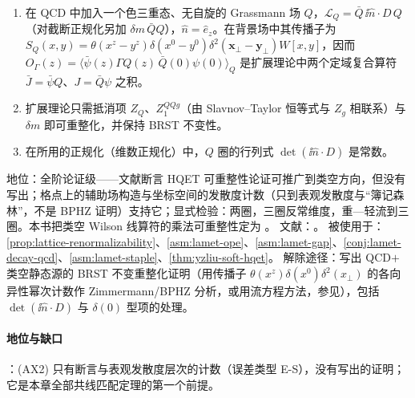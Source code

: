 \begin{assumption}\label{asm:lamet-aux-renorm}
\begin{enumerate}[label=(AX\arabic*),leftmargin=3.2em,itemsep=1pt,topsep=2pt]
\item 在 QCD 中加入一个色三重态、无自旋的 Grassmann 场 $Q$，$\mathcal L_Q=\bar Q\,\ii\hat n\cdot D\,Q$（对截断正规化另加 $\delta m\,\bar QQ$），$\hat n=\hat e_z$。在背景场中其传播子为 $S_Q(x,y)=\theta(x^z-y^z)\delta(x^0-y^0)\delta^2(\mathbf x_\perp-\mathbf y_\perp)W[x,y]$，因而 $O_\Gamma(z)=\langle\bar\psi(z)\Gamma Q(z)\,\bar Q(0)\psi(0)\rangle_Q$ 是扩展理论中两个定域复合算符 $\bar J=\bar\psi Q$、$J=\bar Q\psi$ 之积。
\item 扩展理论只需抵消项 $Z_Q$、$Z_1^{QQg}$（由 Slavnov--Taylor 恒等式与 $Z_g$ 相联系）与 $\delta m$ 即可重整化，并保持 BRST 不变性。
\item 在所用的正规化（维数正规化）中，$Q$ 圈的行列式 $\det(\ii\hat n\cdot D)$ 是常数。
\end{enumerate}
地位：全阶论证级——文献\cite{Ji:2017oey}断言 HQET 可重整性论证可推广到类空方向，但没有写出；格点上的辅助场构造\cite{Green:2017xeu}与坐标空间的发散度计数\cite{Ishikawa:2017faj}（只到表观发散度与“簿记森林”，不是 BPHZ 证明）支持它；显式检验：两圈\cite{Ji:2015jwa}，三圈反常维度\cite{Braun:2020ymy}，重—轻流到三圈\cite{Chetyrkin:2003vi}。本书把类空 Wilson 线算符的乘法可重整性定为 \tagA。
文献：\cite{Ji:2017oey,Green:2017xeu,Ishikawa:2017faj,Dorn:1986dt,Dotsenko:1979wb,Braun:2020ymy,Chetyrkin:2003vi}。
被使用于：\cref{prop:lattice-renormalizability}、\cref{asm:lamet-ope}、\cref{asm:lamet-gap}、\cref{conj:lamet-decay-qcd}、\cref{asm:lamet-staple}、\cref{thm:yzliu-soft-hqet}。
解除途径：写出 QCD$+$类空静态源的 BRST 不变重整化证明（用传播子 $\theta(x^z)\delta(x^0)\delta^2(x_\perp)$ 的各向异性幂次计数作 Zimmermann/BPHZ 分析，或用流方程方法，参见\cite{Frob:2015uqy}），包括 $\det(\ii\hat n\cdot D)$ 与 $\delta(0)$ 型项的处理。
\end{assumption}

\paragraph{地位与缺口}
\tagA：(AX2) 只有断言与表观发散度层次的计数（误差类型 E-S），没有写出的证明；它是本章全部共线匹配定理的第一个前提。

